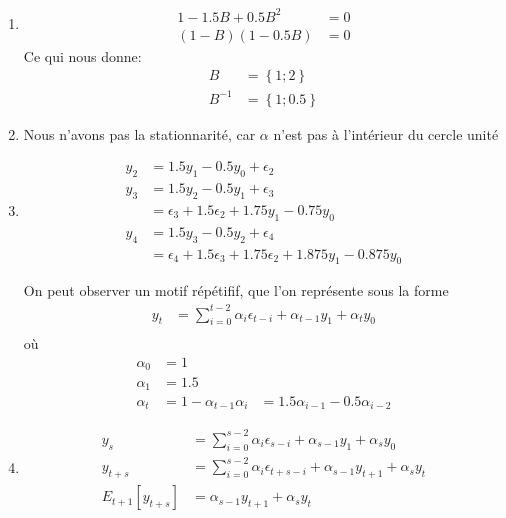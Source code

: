 \begin{exercice}
\begin{sol}
\begin{enumerate}
\item
  \begin{align*}
    1 - 1.5B + 0.5B^2 &= 0 \\
    (1-B)(1-0.5B) &= 0
  \end{align*}
  Ce qui nous donne:
  \begin{align*}
    B &= \left\{ 1;2 \right\} \\
    B^{-1} &= \left\{ 1;0.5 \right\}
  \end{align*}

\item Nous n'avons pas la stationnarité, car $\alpha$ n'est pas à l'intérieur du cercle unité

\item
  \begin{align*}
    y_2 &= 1.5 y_1 - 0.5y_0 + \epsilon_2 \\
    y_3 &= 1.5 y_2 - 0.5y_1 + \epsilon_3 \\
    &= \epsilon_3 + 1.5 \epsilon_2 + 1.75y_1 - 0.75 y_0 \\
    y_4 &= 1.5 y_3 - 0.5y_2 + \epsilon_4 \\
    &= \epsilon_4 + 1.5 \epsilon_3 + 1.75 \epsilon_2 + 1.875 y_1 - 0.875 y_0
  \end{align*}
  
  On peut observer un motif répétifif, que l'on représente sous la forme
  \begin{align*}
    y_t &= \sum_{i=0}^{t-2} \alpha_i\epsilon_{t-i} + \alpha_{t-1}y_1 + \alpha_t y_0 \\
  \end{align*}
  où 
  \begin{align*}
    \alpha_0 &= 1\\ 
    \alpha_1 &= 1.5\\
    \alpha_t &= 1-\alpha_{t-1}
    \alpha_i &= 1.5 \alpha_{i-1} - 0.5 \alpha_{i-2}
  \end{align*}
\item 
  \begin{align*}
    y_s &= \sum_{i=0}^{s-2} \alpha_i\epsilon_{s-i} + \alpha_{s-1}y_1 + \alpha_s y_0 \\
    y_{t+s} &= \sum_{i=0}^{s-2} \alpha_i\epsilon_{t+s-i} + \alpha_{s-1}y_{t+1} + \alpha_s y_t \\
    E_{t+1}\left[y_{t+s}\right] &= \alpha_{s-1} y_{t+1} + \alpha_s y_t
  \end{align*}


\end{enumerate}
\end{sol}
\end{exercice}
